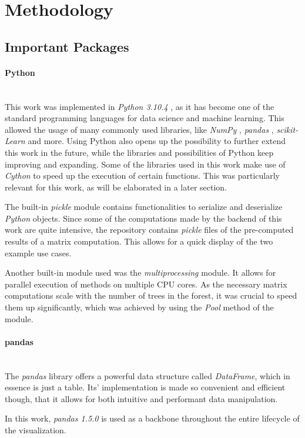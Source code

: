 \documentclass[a4paper, 12pt]{article}
\begin{document}
\section{Methodology}
\subsection {Important Packages}
\paragraph{Python}\mbox{}\\
This work was implemented in \textit{Python 3.10.4} \cite{10.5555/1593511}, as it has
become one of the standard programming languages for data science and machine learning.
This allowed the usage of many commonly used libraries, like \textit{NumPy} \cite{harris2020array},
\textit{pandas} \cite{mckinney-proc-scipy-2010}, \textit{scikit-Learn} \cite{scikit-learn} and more.
Using Python also opens up the possibility to further extend this work in the future, while
the libraries and possibilities of Python keep improving and expanding.
Some of the libraries used in this work make use of \textit{Cython} \cite{behnel2011cython} to
speed up the execution of certain functions. This was particularly relevant for this work, as will
be elaborated in a later section. \par
The built-in \textit{pickle} module contains functionalities to serialize and deserialize
\textit{Python} objects.
Since some of the computations made by the backend of this work are quite intensive, the repository
contains \textit{pickle} files of the pre-computed results of a matrix computation. This allows
for a quick display of the two example use cases. \par
Another built-in module used was the \textit{multiprocessing} module. It allows for parallel
execution of methods on multiple CPU cores. As the necessary matrix computations scale with the
number of trees in the forest, it was crucial to speed them up significantly, which was achieved
by using the \textit{Pool} method of the module.

\paragraph{pandas}\mbox{}\\
The \textit{pandas} library offers a powerful data structure called \textit{DataFrame}, which in
essence is just a table. Its' implementation is made so convenient and efficient though, that it
allows for both intuitive and performant data manipulation. \par
In this work, \textit{pandas 1.5.0} is used as a backbone throughout the entire lifecycle of the
visualization.
\end{document}
